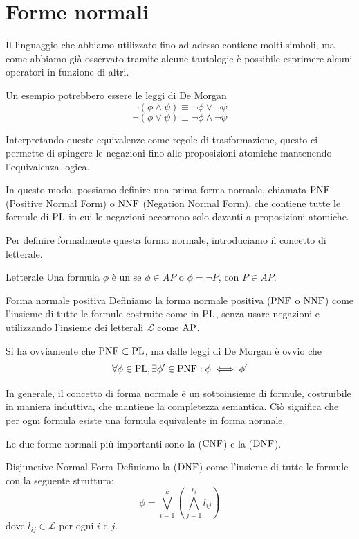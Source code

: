 \section{Forme normali}

Il linguaggio che abbiamo utilizzato fino ad adesso contiene molti simboli, ma come abbiamo già osservato tramite alcune tautologie è possibile esprimere alcuni operatori in funzione di altri.

Un esempio potrebbero essere le leggi di De Morgan
\[\neg(\phi\land\psi) \equiv \neg\phi \lor \neg\psi\]
\[\neg(\phi\lor\psi) \equiv \neg\phi \land \neg\psi\]

Interpretando queste equivalenze come regole di trasformazione, questo ci permette di spingere le negazioni fino alle proposizioni atomiche mantenendo l'equivalenza logica.

In questo modo, possiamo definire una prima forma normale, chiamata \(\operatorname{PNF}\) (Positive Normal Form) o \(\operatorname{NNF}\) (Negation Normal Form), che contiene tutte le formule di \(\operatorname{PL}\) in cui le negazioni occorrono solo davanti a proposizioni atomiche.

Per definire formalmente questa forma normale, introduciamo il concetto di letterale.

\begin{definition}{Letterale}
  Una formula \(\phi\) è un  se \(\phi \in AP\) o \(\phi = \neg P \), con \(P \in AP\).
\end{definition}

\begin{definition}{Forma normale positiva}
  Definiamo la forma normale positiva (\(\operatorname{PNF}\) o \(\operatorname{NNF}\)) come l'insieme di tutte le formule costruite come in \(\operatorname{PL}\), senza usare negazioni e utilizzando l'insieme dei letterali \(\mathcal{L}\) come \(\AP\).
\end{definition}

Si ha ovviamente che \(\operatorname{PNF} \subset \operatorname{PL}\), ma dalle leggi di De Morgan è ovvio che
\[\forall \phi \in \operatorname{PL}, \exists \phi' \in \operatorname{PNF}: \phi \iff \phi'\]

In generale, il concetto di forma normale è un sottoinsieme di formule, costruibile in maniera induttiva, che mantiene la completezza semantica.
Ciò significa che per ogni formula esiste una formula equivalente in forma normale.

Le due forme normali più importanti sono la  (\(\operatorname{CNF}\)) e la  (\(\operatorname{DNF}\)).

\begin{definition}{Disjunctive Normal Form}
  Definiamo la  (\(\operatorname{DNF}\)) come l'insieme di tutte le formule con la seguente struttura:
  \[\phi = \bigvee_{i=1}^k\left(\bigwedge_{j=1}^{r_i} l_{ij}\right)\]
  dove \(l_{ij} \in \mathcal{L}\) per ogni \(i\) e \(j\).
\end{definition}

